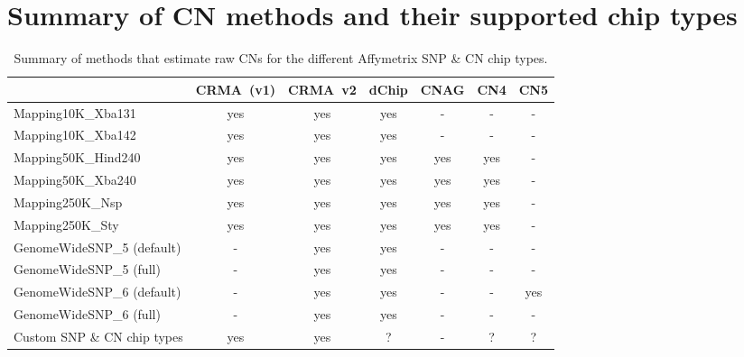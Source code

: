 \documentclass[10pt,a4paper]{article}
\begin{document}
\clearpage
\section{Summary of CN methods and their supported chip types}

\begin{table}[hp]
\begin{center}
\begin{tabular}{|l|cc|c|c|cc|}
\hline
                             & CRMA~(v1) & CRMA~v2 & dChip & CNAG & CN4 & CN5 \\
\hline
\hline
Mapping10K\_Xba131           & yes     & yes       & yes   &    - &   - &  -  \\
Mapping10K\_Xba142           & yes     & yes       & yes   &    - &   - &  -  \\
\hline
Mapping50K\_Hind240          & yes     & yes       & yes   &  yes & yes &  -  \\
Mapping50K\_Xba240           & yes     & yes       & yes   &  yes & yes &  -  \\
\hline
Mapping250K\_Nsp             & yes     & yes       & yes   &  yes & yes &  -  \\
Mapping250K\_Sty             & yes     & yes       & yes   &  yes & yes &  -  \\
\hline
GenomeWideSNP\_5 (default)   &  -      & yes       & yes   &    - &  -  &  -  \\
GenomeWideSNP\_5 (full)      &  -      & yes       & yes   &    - &  -  &  -  \\
\hline
GenomeWideSNP\_6 (default)   &  -      & yes       & yes   &    - &  -  & yes \\
GenomeWideSNP\_6 (full)      &  -      & yes       & yes   &    - &  -  &  -  \\
\hline
Custom SNP \& CN chip types  &  yes    & yes       &   ?   &    - &  ?  &  ?  \\
\hline
\end{tabular}
\end{center}
\caption{Summary of methods that estimate raw CNs for the different Affymetrix SNP \& CN chip types.}
\label{tblSummaryOfMethods}
\end{table}



\clearpage
\end{document}
